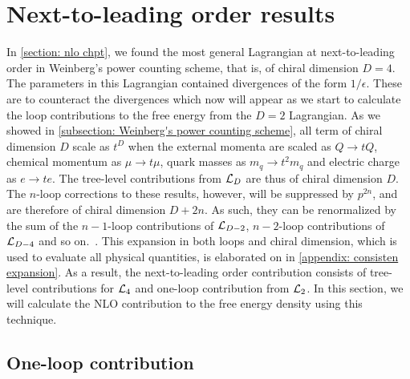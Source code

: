 \section{Next-to-leading order results}
\label{section: nlo thermodynamics}

In \autoref{section: nlo chpt}, we found the most general Lagrangian at next-to-leading order in Weinberg's power counting scheme, that is, of chiral dimension $D = 4$.
The parameters in this Lagrangian contained divergences of the form $1 / \epsilon$.
These are to counteract the divergences which now will appear as we start to calculate the loop contributions to the free energy from the $D = 2$ Lagrangian.
As we showed in \autoref{subsection: Weinberg's power counting scheme}, all term of chiral dimension $D$ scale as $t^D$ when the external momenta are scaled as $Q\rightarrow tQ$, chemical momentum as $\mu\rightarrow t\mu$, quark masses as $m_q\rightarrow t^2 m_q$ and electric charge as $e\rightarrow t e$.
The tree-level contributions from $\mathcal{L}_D$ are thus of chiral dimension $D$.
The $n$-loop corrections to these results, however, will be suppressed by $p^{2n}$, and are therefore of chiral dimension $D+2n$.
As such, they can be renormalized by the sum of the $n-1$-loop contributions of $\mathcal{L}_{D-2}$, $n-2$-loop contributions of $\mathcal{L}_{D-4}$ and so on.~\autocite{gasserChiralPerturbationTheory1984,weinbergPhenomenologicalLagrangians1979a}.
This expansion in both loops and chiral dimension, which is used to evaluate all physical quantities, is elaborated on in \autoref{appendix: consisten expansion}.
As a result, the next-to-leading order contribution consists of tree-level contributions for $\mathcal{L}_4$ and one-loop contribution from $\mathcal{L}_2$.
In this section, we will calculate the NLO contribution to the free energy density using this technique.



\subsection{One-loop contribution}

